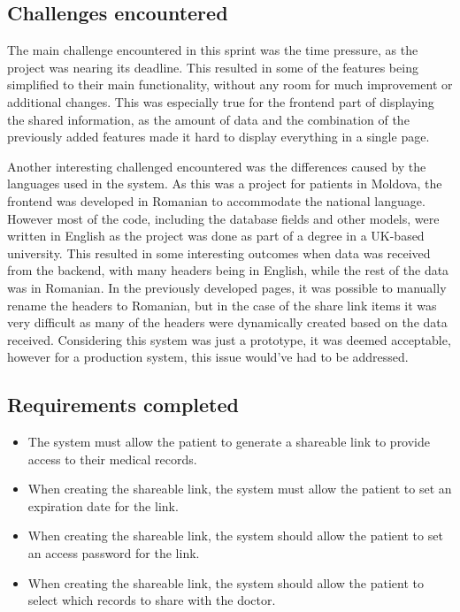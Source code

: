\noindent\begin{minipage}{\textwidth}
  \begin{center}
      \label{fig:erd_s6}
  \end{center}
\end{minipage}

\subsection{Challenges encountered}

The main challenge encountered in this sprint was the time pressure, as the project was nearing its deadline. This resulted in some of the features being simplified to their main functionality, without any room for much improvement or additional changes. This was especially true for the frontend part of displaying the shared information, as the amount of data and the combination of the previously added features made it hard to display everything in a single page.

Another interesting challenged encountered was the differences caused by the languages used in the system. As this was a project for patients in Moldova, the frontend was developed in Romanian to accommodate the national language. However most of the code, including the database fields and other models, were written in English as the project was done as part of a degree in a UK-based university. This resulted in some interesting outcomes when data was received from the backend, with many headers being in English, while the rest of the data was in Romanian. In the previously  developed pages, it was possible to manually rename the headers to Romanian, but in the case of the share link items it was very difficult as many of the headers were dynamically created based on the data received. Considering this system was just a prototype, it was deemed acceptable, however for a production system, this issue would've had to be addressed.

\subsection{Requirements completed}

\begin{itemize}
  \item The system must allow the patient to generate a shareable link to provide access to their medical records.
  \item When creating the shareable link, the system must allow the patient to set an expiration date for the link.
  \item When creating the shareable link, the system should allow the patient to set an access password for the link.
  \item When creating the shareable link, the system should allow the patient to select which records to share with the doctor.
\end{itemize}